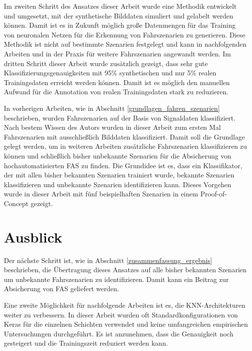 Im zweiten Schritt des Ansatzes dieser Arbeit wurde eine Methodik entwickelt und umgesetzt, mit der synthetische Bilddaten simuliert und gelabelt werden können. Damit ist es in Zukunft möglich große Datenmengen für das Training von neuronalen Netzen für die Erkennung von Fahrszenarien zu generieren. Diese Methodik ist nicht auf bestimmte Szenarien festgelegt und kann in nachfolgenden Arbeiten und in der Praxis für weitere Fahrszenarien angewandt werden. Im dritten Schritt dieser Arbeit wurde zusätzlich gezeigt, dass sehr gute Klassifizierungsgenauigkeiten mit 95\% synthetischen und nur 5\% realen Trainingsdaten erreicht werden können. Damit ist es möglich den manuellen Aufwand für die Annotation von realen Trainingsdaten stark zu reduzieren.

In vorherigen Arbeiten, wie in Abschnitt \ref{grundlagen_fahren_szenarien} beschrieben, wurden Fahrszenarien auf der Basis von Signaldaten klassifiziert. Nach bestem Wissen des Autors wurden in dieser Arbeit zum ersten Mal Fahrszenarien mit ausschließlich Bilddaten klassifiziert. Damit soll die Grundlage gelegt werden, um in weiteren Arbeiten zusätzliche Fahrszenarien klassifizieren zu können und schließlich bisher unbekannte Szenarien für die Absicherung von hochautomatisierten \ac{FAS} zu finden. Die Grundidee ist es, dass ein Klassifikator, der mit allen bisher bekannten Szenarien trainiert wurde, bekannte Szenarien klassifizieren und unbekannte Szenarien identifizieren kann. Dieses Vorgehen wurde in dieser Arbeit mit fünf beispielhaften Szenarien in einem Proof-of-Concept gezeigt.
 
 \section{Ausblick}
 \label{zusammenfassung_ausblick}

Der nächste Schritt ist, wie in Abschnitt \ref{zusammenfassung_ergebnis} beschrieben, die Übertragung dieses Ansatzes auf alle bisher bekannten Szenarien um unbekannte Fahrszenarien zu identifizieren. Damit kann ein Beitrag zur Absicherung von \ac{FAS} geliefert werden.

Eine zweite Möglichkeit für nachfolgende Arbeiten ist es, die \ac{KNN}-Architekturen weiter zu verbessern. In dieser Arbeit wurden oft Standardkonfigurationen von Keras \cite{chollet2015keras} für die einzelnen Schichten verwendet und keine umfangreichen empirischen Untersuchungen durchgeführt. Es ist anzunehmen, dass die Genauigkeit noch gesteigert und die Trainingszeit reduziert werden kann.


